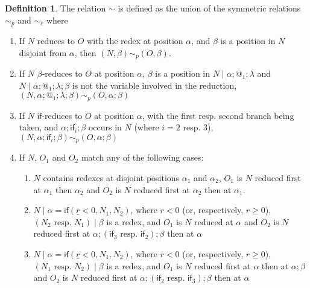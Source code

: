 \documentclass{article}
\newcommand{\tif}[3]{\mathsf{if}(#1, #2, #3)} %
\theoremstyle{definition}
\newtheorem{definition}{Definition}
\theoremstyle{lemma}
\theoremstyle{remark}
\begin{document}

\begin{definition}
The relation $\sim$ is defined as the union of the symmetric relations $\sim_p$  and $\sim_c$  where
\begin{enumerate}
    \item If $N$ reduces to $O$ with the redex at position $\alpha$, and $\beta$ is a position in $N$ disjoint from $\alpha$, then $(N,\beta) \sim_p (O,\beta)$.
    
    \item If $N$ $\beta$-reduces to $O$ at position $\alpha$, $\beta$ is a position in $N \mid \alpha;@_1;\lambda$ and $N \mid \alpha;@_1;\lambda;\beta$ is not the variable involved in the reduction, $(N,\alpha;@_1;\lambda;\beta) \sim_p (O, \alpha;\beta)$
    
    \item If $N$ $\textsf{if}$-reduces to $O$ at position $\alpha$, with the first resp. second branch being taken, and $\alpha;\textsf{if}_i;\beta$ occurs in $N$ (where $i = 2$ resp. $3$), $(N,\alpha;\textsf{if}_i;\beta) \sim_p (O,\alpha;\beta)$
    
    \item If $N$, $O_1$ and $O_2$ match any of the following cases:
    \begin{enumerate}
        \item $N$ contains redexes at disjoint positions $\alpha_1$ and $\alpha_2$, $O_1$ is $N$ reduced first at $\alpha_1$ then $\alpha_2$ and $O_2$ is $N$ reduced first at $\alpha_2$ then at $\alpha_1$.
        
        \item $N \mid \alpha = \tif{\underline r < 0}{N_1}{N_2}$, where $r < 0$ (or, respectively, $r \geq 0$), $(N_2 \text{ resp. } N_1) \mid \beta$ is a redex, and $O_1$ is $N$ reduced at $\alpha$ and $O_2$ is $N$ reduced first at $\alpha;(\textsf{if}_3 \text{ resp. } \textsf{if}_2);\beta$ then at $\alpha$
        
        \item $N \mid \alpha = \tif{\underline r < 0}{N_1}{N_2}$, where $r < 0$ (or, respectively, $r \geq 0$), $(N_1 \text{ resp. } N_2) \mid \beta$ is a redex, and $O_1$ is $N$ reduced first at $\alpha$ then at $\alpha;\beta$ and $O_2$ is $N$ reduced first at $\alpha;(\textsf{if}_2 \text{ resp. } \textsf{if}_3);\beta$ then at $\alpha$
        

\end{enumerate}
\end{enumerate}
\end{definition}
\end{document}
